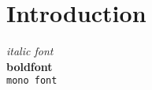\section{Introduction}
%

\textit{italic font}\\
\textbf{boldfont}\\
\texttt{mono font}\\
\bigskip

\lipsum[1-1]